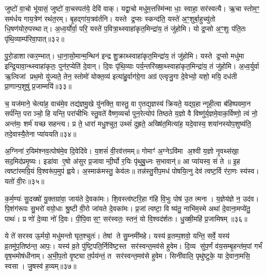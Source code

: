 {}

जुष्टो॑ वा॒चो भू॑यासं॒ जुष्टो॑ वा॒चस्पत॑ये॒ देवि॑ वाक्। यद्वा॒चो मधु॑म॒त्तस्मि॑न्मा धाः॒ स्वाहा॒ सर॑स्वत्यै। ऋ॒चा स्तोम॒ꣳ॒ सम॑र्धय गाय॒त्रेण॑ रथंत॒रम्। बृ॒हद्गा॑य॒त्रव॑र्तनि। यस्ते द्र॒प्सः स्कन्द॑ति॒ यस्ते॑ अ॒ꣳ॒शुर्बा॒हुच्यु॑तो धि॒षण॑योरु॒पस्थात्। अ॒ध्व॒र्योर्वा॒ परि॒ यस्ते॑ प॒वित्रा॒थ्स्वाहा॑कृत॒मिन्द्रा॑य॒ तं जु॑होमि। यो द्र॒प्सो अ॒ꣳ॒शुः प॑ति॒तः पृ॑थि॒व्याम्प॑रिवा॒पात्॥३२॥

पु॒रो॒डाशात्कर॒म्भात्। धा॒ना॒सो॒मान्म॒न्थिन॑ इन्द्र शु॒क्राथ्स्वाहा॑कृत॒मिन्द्रा॑य॒ तं जु॑होमि। यस्ते द्र॒प्सो मधु॑मा इन्द्रि॒यावा॒न्थ्स्वाहा॑कृतः॒ पुन॑र॒प्येति॑ दे॒वान्। दि॒वः पृ॑थि॒व्याः पर्य॒न्तरि॑ख्षा॒थ्स्वाहा॑कृत॒मिन्द्रा॑य॒ तं जु॑होमि। अ॒ध्व॒र्युर्वा ऋ॒त्विजां प्रथ॒मो यु॑ज्यते॒ तेन॒ स्तोमो॑ योक्त॒व्य॑ इत्या॑हु॒र्वाग॑ग्रे॒गा अग्र॑ एत्वृजु॒गा दे॒वेभ्यो॒ यशो॒ मयि॒ दध॑ती प्रा॒णान्प॒शुषु॑ प्र॒जाम्मयि॑॥३३॥

च॒ यज॑माने॒ चेत्या॑ह॒ वाच॑मे॒व तद्य॑ज्ञमु॒खे यु॑नक्ति॒ वास्तु॒ वा ए॒तद्य॒ज्ञस्य॑ क्रियते॒ यद्ग्र॒हान्गृही॒त्वा ब॑हिष्पवमा॒न सर्प॑न्ति॒ पराञ्चो॒ हि यन्ति॒ परा॑चीभिः स्तु॒वते॑ वैष्ण॒व्यर्चा पुन॒रेत्योप॑ तिष्ठते य॒ज्ञो वै विष्णु॑र्य॒ज्ञमे॒वाक॒र्विष्णो॒ त्वं नो॒ अन्त॑मः॒ शर्म॑ यच्छ सहन्त्य। प्र ते॒ धारा॑ मधु॒श्चुत॒ उथ्सं॑ दुह्रते॒ अख्षि॑त॒मित्या॑ह॒ यदे॒वास्य॒ शया॑नस्योप॒शुष्य॑ति॒ तदे॒वास्यै॒तेना प्या॑ययति॥३४॥

{\anuvakamend[{प॒रि॒वा॒पात्प्र॒जां मयि॑ दुह्रते॒ चतु॑र्दश च॥10॥}]}

अ॒ग्निना॑ र॒यिम॑श्नव॒त्पोष॑मे॒व दि॒वेदि॑वे। य॒शसं॑ वी॒रव॑त्तमम्॥ गोमाꣳ॑ अ॒ग्नेऽवि॑मा अ॒श्वी य॒ज्ञो नृ॒वथ्स॑खा॒ सद॒मिद॑प्रमृ॒ष्यः। इडा॑वा ए॒षो अ॑सुर प्र॒जावान्दी॒र्घो र॒यिः पृ॑थुबु॒ध्नः स॒भावान्॑॥ आ प्या॑यस्व॒ सं ते॥ इ॒ह त्वष्टा॑रमग्रि॒यं वि॒श्वरू॑प॒मुप॑ ह्वये। अ॒स्माक॑मस्तु॒ केव॑लः॥ तन्न॑स्तु॒रीप॒मध॑ पोषयि॒त्नु देव॑ त्वष्ट॒र्वि र॑रा॒णः स्य॑स्व। यतो॑ वी॒रः॥३५॥

क॒र्म॒ण्यः॑ सु॒दख्षो॑ यु॒क्तग्रा॑वा॒ जाय॑ते दे॒वका॑मः। शि॒वस्त्व॑ष्टरि॒हा ग॑हि वि॒भुः पोष॑ उ॒त त्मना। य॒ज्ञेय॑ज्ञे न॒ उद॑व। पि॒शंग॑रूपः सु॒भरो॑ वयो॒धाः श्रु॒ष्टी वी॒रो जा॑यते दे॒वका॑मः। प्र॒जां त्वष्टा॒ वि ष्य॑तु॒ नाभि॑म॒स्मे अथा॑ दे॒वाना॒मप्ये॑तु॒ पाथः॑। प्र णो॑ दे॒व्या नो॑ दि॒वः। पी॒पि॒वास॒ꣳ॒ सर॑स्वतः॒ स्तनं॒ यो वि॒श्वद॑र्शतः। धु॒ख्षी॒महि॑ प्र॒जामिषम्॥३६॥

ये ते॑ सरस्व ऊ॒र्मयो॒ मधु॑मन्तो घृत॒श्चुतः॑। तेषां ते सु॒म्नमी॑महे। यस्य॑ व्र॒तम्प॒शवो॒ यन्ति॒ सर्वे॒ यस्य॑ व्र॒तमु॑प॒तिष्ठ॑न्त॒ आपः॒। यस्य॑ व्र॒ते पु॑ष्टि॒पति॒र्निवि॑ष्ट॒स्त सर॑स्वन्त॒मव॑से हुवेम। दि॒व्य सु॑प॒र्णं व॑य॒सम्बृ॒हन्त॑म॒पां गर्भं॑ वृष॒भमोष॑धीनाम्। अ॒भी॒प॒तो वृ॒ष्ट्या त॒र्पय॑न्तं॒ त सर॑स्वन्त॒मव॑से हुवेम। सिनी॑वालि॒ पृथु॑ष्टुके॒ या दे॒वाना॒मसि॒ स्वसा। जु॒षस्व॑ ह॒व्यम्॥३७॥

